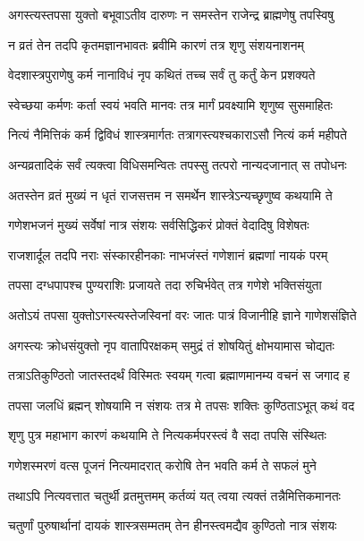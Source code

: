 \twolineshloka
{अगस्त्यस्तपसा युक्तो बभूवाऽतीव दारुणः}
{न समस्तेन राजेन्द्र ब्राह्मणेषु तपस्विषु} %

\twolineshloka
{न व्रतं तेन तदपि कृतमज्ञानभावतः}
{ब्रवीमि कारणं तत्र श‍ृणु संशयनाशनम्} %

\twolineshloka
{वेदशास्त्रपुराणेषु कर्म नानाविधं नृप}
{कथितं तच्च सर्वं तु कर्तुं केन प्रशक्यते} %

\twolineshloka
{स्वेच्छया कर्मणः कर्ता स्वयं भवति मानवः}
{तत्र मार्गं प्रवक्ष्यामि श‍ृणुष्व सुसमाहितः} %

\twolineshloka
{नित्यं नैमित्तिकं कर्म द्विविधं शास्त्रमार्गतः}
{तत्रागस्त्यश्चकाराऽसौ नित्यं कर्म महीपते} %

\twolineshloka
{अन्यव्रतादिकं सर्वं त्यक्त्वा विधिसमन्वितः}
{तपस्सु तत्परो नान्यदजानात् स तपोधनः} %

\twolineshloka
{अतस्तेन व्रतं मुख्यं न धृतं राजसत्तम}
{न समर्थेन शास्त्रेऽन्यच्छृणुष्व कथयामि ते} %

\twolineshloka
{गणेशभजनं मुख्यं सर्वेषां नात्र संशयः}
{सर्वसिद्धिकरं प्रोक्तं वेदादिषु विशेषतः} %

\twolineshloka
{राजशार्दूल तदपि नराः संस्कारहीनकाः}
{नाभजंस्तं गणेशानं ब्रह्मणां नायकं परम्} %

\twolineshloka
{तपसा दग्धपापश्च पुण्यराशिः प्रजायते}
{तदा रुचिर्भवेत् तत्र गणेशे भक्तिसंयुता} %

\twolineshloka
{अतोऽयं तपसा युक्तोऽगस्त्यस्तेजस्विनां वरः}
{जातः पात्रं विजानीहि ज्ञाने गाणेशसंज्ञिते} %

\twolineshloka
{अगस्त्यः क्रोधसंयुक्तो नृप वातापिरक्षकम्}
{समुद्रं तं शोषयितुं क्षोभयामास चोद्यतः} %

\twolineshloka
{तत्राऽतिकुण्ठितो जातस्तदर्थं विस्मितः स्वयम्}
{गत्वा ब्रह्माणमानम्य वचनं स जगाद ह} %


\twolineshloka
{तपसा जलधिं ब्रह्मन् शोषयामि न संशयः}
{तत्र मे तपसः शक्तिः कुण्ठिताऽभूत् कथं वद} %


\twolineshloka
{श‍ृणु पुत्र महाभाग कारणं कथयामि ते}
{नित्यकर्मपरस्त्वं वै सदा तपसि संस्थितः} %

\twolineshloka
{गणेशस्मरणं वत्स पूजनं नित्यमादरात्}
{करोषि तेन भवति कर्म ते सफलं मुने} %

\twolineshloka
{तथाऽपि नित्यवत्तात चतुर्थी व्रतमुत्तमम्}
{कर्तव्यं यत् त्वया त्यक्तं तन्नैमित्तिकमानतः} %

\twolineshloka
{चतुर्णां पुरुषार्थानां दायकं शास्त्रसम्मतम्}
{तेन हीनस्त्वमद्यैव कुण्ठितो नात्र संशयः} %

